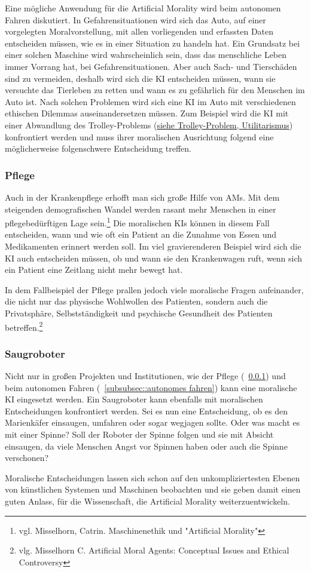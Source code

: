 Eine mögliche Anwendung für die Artificial Morality wird beim autonomen Fahren diskutiert.
In Gefahrensituationen wird sich das Auto, auf einer vorgelegten Moralvorstellung, mit allen vorliegenden und erfassten
Daten entscheiden müssen, wie es in einer Situation zu handeln hat.
Ein Grundsatz bei einer solchen Maschine wird wahrscheinlich sein, dass das menschliche Leben immer Vorrang hat, bei
Gefahrensituationen.
Aber auch Sach- und Tierschäden sind zu vermeiden, deshalb wird sich die KI entscheiden müssen, wann sie versuchte das
Tierleben zu retten und wann es zu gefährlich für den Menschen im Auto ist.
Nach solchen Problemen wird sich eine KI im Auto mit verschiedenen ethischen Dilemmas auseinandersetzen müssen.
Zum Beispiel wird die KI mit einer Abwandlung des Trolley-Problems (\hyperlink{Trolley-Problem}{siehe Trolley-Problem, Utilitarismus}) konfrontiert werden und muss ihrer moralischen Ausrichtung
folgend eine möglicherweise folgenschwere Entscheidung treffen.

\subsubsection{Pflege}\label{subsubsec::pflege}

Auch in der Krankenpflege erhofft man sich große Hilfe von AMs. Mit dem steigenden demografischen Wandel werden rasant mehr
Menschen in einer pflegebedürftigen Lage sein.\footnote{vgl. Misselhorn, Catrin. Maschinenethik und "Artificial Morality"}
Die moralischen KIs können in diesem Fall entscheiden, wann und wie oft ein Patient an die Zunahme von Essen und Medikamenten
erinnert werden soll.
Im viel gravierenderen Beispiel wird sich die KI auch entscheiden müssen, ob und wann sie den Krankenwagen ruft, wenn sich ein
Patient eine Zeitlang nicht mehr bewegt hat.

In dem Fallbeispiel der Pflege prallen jedoch viele moralische Fragen aufeinander, die nicht nur das physische Wohlwollen des Patienten,
sondern auch die Privatsphäre, Selbstständigkeit und psychische Gesundheit des Patienten betreffen.\footnote{vlg. Misselhorn C. Artificial Moral Agents: Conceptual Issues and Ethical Controversy}

\subsubsection{Saugroboter}\label{subsubsec::saugroboter}

Nicht nur in großen Projekten und Institutionen, wie der Pflege (~\ref{subsubsec::pflege}) und beim autonomen Fahren (~\ref{subsubsec::autonomes fahren})
kann eine moralische KI eingesetzt werden.
Ein Saugroboter kann ebenfalls mit moralischen Entscheidungen konfrontiert werden.
Sei es nun eine Entscheidung, ob es den Marienkäfer einsaugen, umfahren oder sogar wegjagen sollte.
Oder was macht es mit einer Spinne?
Soll der Roboter der Spinne folgen und sie mit Absicht einsaugen, da viele Menschen Angst vor Spinnen haben oder auch
die Spinne verschonen?

Moralische Entscheidungen lassen sich schon auf den unkompliziertesten Ebenen von künstlichen Systemen und Maschinen beobachten
und sie geben damit einen guten Anlass, für die Wissenschaft, die Artificial Morality weiterzuentwickeln.

